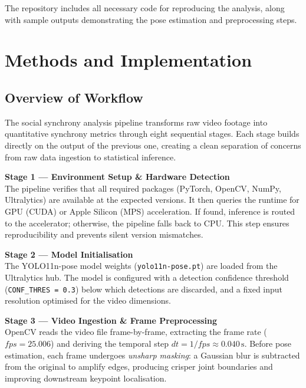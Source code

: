 \documentclass[11pt]{article}
\begin{document}
The repository includes all necessary code for reproducing the analysis, along with sample outputs demonstrating the pose estimation and preprocessing steps.

\section{Methods and Implementation}

\subsection{Overview of Workflow}
The social synchrony analysis pipeline transforms raw video footage into quantitative synchrony metrics through eight sequential stages. Each stage builds directly on the output of the previous one, creating a clean separation of concerns from raw data ingestion to statistical inference.

\vspace{0.5em}
\noindent\textbf{Stage 1 — Environment Setup \& Hardware Detection}\\
The pipeline verifies that all required packages (PyTorch, OpenCV, NumPy, Ultralytics) are available at the expected versions. It then queries the runtime for GPU (CUDA) or Apple Silicon (MPS) acceleration. If found, inference is routed to the accelerator; otherwise, the pipeline falls back to CPU. This step ensures reproducibility and prevents silent version mismatches.

\vspace{0.5em}
\noindent\textbf{Stage 2 — Model Initialisation}\\
The YOLO11n-pose model weights (\texttt{yolo11n-pose.pt}) are loaded from the Ultralytics hub. The model is configured with a detection confidence threshold (\texttt{CONF\_THRES~=~0.3}) below which detections are discarded, and a fixed input resolution optimised for the video dimensions.

\vspace{0.5em}
\noindent\textbf{Stage 3 — Video Ingestion \& Frame Preprocessing}\\
OpenCV reads the video file frame-by-frame, extracting the frame rate (\(fps = 25.006\)) and deriving the temporal step \(dt = 1/fps \approx 0.040\,\text{s}\). Before pose estimation, each frame undergoes \textit{unsharp masking}: a Gaussian blur is subtracted from the original to amplify edges, producing crisper joint boundaries and improving downstream keypoint localisation.
\end{document}
